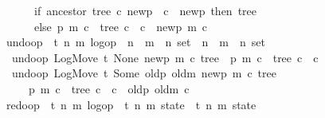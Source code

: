 \documentclass[sigplan,anonymous]{acmart}
\renewcommand{\isacartoucheopen}{}
\renewcommand{\isacartoucheclose}{}
\begin{document}
\begin{figure}
\begin{isabellebody}
\ \ \ \ \ \ if\ ancestor\ tree\ c\ newp\ {\isasymor}\ c\ {\isacharequal}\ newp\ then\ tree\isanewline
\ \ \ \ \ \ else\ {\isacharbraceleft}{\isacharparenleft}p{\isacharprime}{\isacharcomma}\ m{\isacharprime}{\isacharcomma}\ c{\isacharprime}{\isacharparenright}\ {\isasymin}\ tree{\isachardot}\ c{\isacharprime}\ {\isasymnoteq}\ c{\isacharbraceright}\ {\isasymunion}\ {\isacharbraceleft}{\isacharparenleft}newp{\isacharcomma}\ m{\isacharcomma}\ c{\isacharparenright}{\isacharbraceright}{\isacharparenright}{\isacartoucheclose}\isanewline
\isanewline
{}\isamarkupfalse%
\ undo{\isacharunderscore}op\ {\isacharcolon}{\isacharcolon}\ {\isacartoucheopen}{\isacharparenleft}{\isacharprime}t{\isacharcomma}\ {\isacharprime}n{\isacharcomma}\ {\isacharprime}m{\isacharparenright}\ log{\isacharunderscore}op\ {\isasymtimes}\ {\isacharparenleft}{\isacharprime}n\ {\isasymtimes}\ {\isacharprime}m\ {\isasymtimes}\ {\isacharprime}n{\isacharparenright}\ set\ {\isasymRightarrow}\ {\isacharparenleft}{\isacharprime}n\ {\isasymtimes}\ {\isacharprime}m\ {\isasymtimes}\ {\isacharprime}n{\isacharparenright}\ set{\isacartoucheclose}\ \isanewline
\ \ {\isacartoucheopen}undo{\isacharunderscore}op\ {\isacharparenleft}LogMove\ t\ None\ newp\ m\ c{\isacharcomma}\ tree{\isacharparenright}\ {\isacharequal}\ {\isacharbraceleft}{\isacharparenleft}p{\isacharprime}{\isacharcomma}\ m{\isacharprime}{\isacharcomma}\ c{\isacharprime}{\isacharparenright}\ {\isasymin}\ tree{\isachardot}\ c{\isacharprime}\ {\isasymnoteq}\ c{\isacharbraceright}{\isacartoucheclose}\ {\isacharbar}\isanewline
\ \ {\isacartoucheopen}undo{\isacharunderscore}op\ {\isacharparenleft}LogMove\ t\ {\isacharparenleft}Some\ {\isacharparenleft}oldp{\isacharcomma}\ oldm{\isacharparenright}{\isacharparenright}\ newp\ m\ c{\isacharcomma}\ tree{\isacharparenright}\ {\isacharequal}\isanewline
\ \ \ \ \ {\isacharbraceleft}{\isacharparenleft}p{\isacharprime}{\isacharcomma}\ m{\isacharprime}{\isacharcomma}\ c{\isacharprime}{\isacharparenright}\ {\isasymin}\ tree{\isachardot}\ c{\isacharprime}\ {\isasymnoteq}\ c{\isacharbraceright}\ {\isasymunion}\ {\isacharbraceleft}{\isacharparenleft}oldp{\isacharcomma}\ oldm{\isacharcomma}\ c{\isacharparenright}{\isacharbraceright}{\isacartoucheclose}\isanewline
\isanewline
{}\isamarkupfalse%
\ redo{\isacharunderscore}op\ {\isacharcolon}{\isacharcolon}\ {\isacartoucheopen}{\isacharparenleft}{\isacharprime}t{\isacharcomma}\ {\isacharprime}n{\isacharcomma}\ {\isacharprime}m{\isacharparenright}\ log{\isacharunderscore}op\ {\isasymRightarrow}\ {\isacharparenleft}{\isacharprime}t{\isacharcomma}\ {\isacharprime}n{\isacharcomma}\ {\isacharprime}m{\isacharparenright}\ state\ {\isasymRightarrow}\ {\isacharparenleft}{\isacharprime}t{\isacharcomma}\ {\isacharprime}n{\isacharcomma}\ {\isacharprime}m{\isacharparenright}\ state{\isacartoucheclose}\ \isanewline

\end{isabellebody}
\end{figure}
\end{document}

